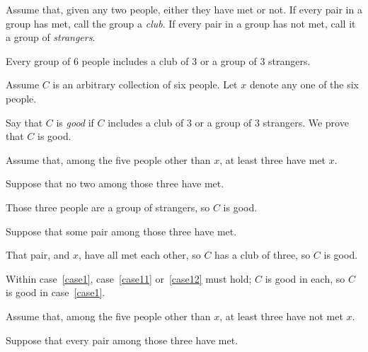 \documentclass[11pt]{article}
\begin{document}
\begin{problems}
  \newpage

  \problem

  Assume that, given any two people, either they have met or not. 
  If every pair in a group has met, call the group a \emph{club}. 
  If every pair in a group has not met, call it a group of \emph{strangers}.

  \begin{theorem}
    Every group of 6 people includes a club of 3 or a group of 3 strangers.
  \end{theorem}

  \begin{longFormProof}
    \begin{block}[block40]
      {Assume $C$ is an arbitrary collection of six people.
        Let $x$ denote any one of the six people.

        Say that $C$ is \emph{good} if $C$ includes a club of 3 or a group of 3 strangers.
        We prove that $C$ is good.}

      \begin{case}[case1]
        {Assume that, among the five people other than $x$, at least three have met $x$.}

        \begin{case}[case11]
          {Suppose that no two among those three have met.}

          \step Those three people are a group of strangers, 
          so $C$ is good.
        \end{case}

        \begin{case}[case12]
          {Suppose that some pair among those three have met.}

          \step That pair, and $x$, have all met each other, so $C$ has a club of three, 
          so $C$ is good.
        \end{case}

        \step Within case~\ref{case1}, case~\ref{case11} or~\ref{case12} must hold;
        $C$ is good in each,
        so $C$ is good in case~\ref{case1}.
      \end{case}
      
      \begin{case}[case2]
        {Assume that, among the five people other than $x$, 
        at least three have not met $x$.}

        \begin{case}[case21]
          {Suppose that every pair among those three have met.}
      

\end{case}
\end{case}
\end{block}
\end{longFormProof}
\end{problems}
\end{document}
